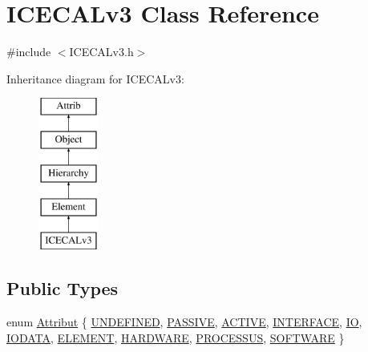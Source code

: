 \hypertarget{classICECALv3}{}\section{I\+C\+E\+C\+A\+Lv3 Class Reference}
\label{classICECALv3}


{\ttfamily \#include $<$I\+C\+E\+C\+A\+Lv3.\+h$>$}

Inheritance diagram for I\+C\+E\+C\+A\+Lv3\+:\begin{figure}[H]
\begin{center}
\leavevmode
\includegraphics[height=5.000000cm]{classICECALv3}
\end{center}
\end{figure}
\subsection*{Public Types}
\begin{DoxyCompactItemize}
\item 
enum \hyperlink{classAttrib_a69e171d7cc6417835a5a306d3c764235}{Attribut} \{ \newline
\hyperlink{classAttrib_a69e171d7cc6417835a5a306d3c764235a3a8da2ab97dda18aebab196fe4100531}{U\+N\+D\+E\+F\+I\+N\+ED}, 
\hyperlink{classAttrib_a69e171d7cc6417835a5a306d3c764235a2bfb2af57b87031d190a05fe25dd92ed}{P\+A\+S\+S\+I\+VE}, 
\hyperlink{classAttrib_a69e171d7cc6417835a5a306d3c764235a3b1fec929c0370d1436f2f06e298fb0d}{A\+C\+T\+I\+VE}, 
\hyperlink{classAttrib_a69e171d7cc6417835a5a306d3c764235aa27c16b480a369ea4d18b07b2516bbc7}{I\+N\+T\+E\+R\+F\+A\+CE}, 
\newline
\hyperlink{classAttrib_a69e171d7cc6417835a5a306d3c764235a1420a5b8c0540b2af210b6975eded7f9}{IO}, 
\hyperlink{classAttrib_a69e171d7cc6417835a5a306d3c764235a0af3b0d0ac323c1704e6c69cf90add28}{I\+O\+D\+A\+TA}, 
\hyperlink{classAttrib_a69e171d7cc6417835a5a306d3c764235a7788bc5dd333fd8ce18562b269c9dab1}{E\+L\+E\+M\+E\+NT}, 
\hyperlink{classAttrib_a69e171d7cc6417835a5a306d3c764235a61ceb22149f365f1780d18f9d1459423}{H\+A\+R\+D\+W\+A\+RE}, 
\newline
\hyperlink{classAttrib_a69e171d7cc6417835a5a306d3c764235a75250e29692496e73effca2c0330977f}{P\+R\+O\+C\+E\+S\+S\+US}, 
\hyperlink{classAttrib_a69e171d7cc6417835a5a306d3c764235a103a67cd0b8f07ef478fa45d4356e27b}{S\+O\+F\+T\+W\+A\+RE}
 \}
\end{DoxyCompactItemize}
